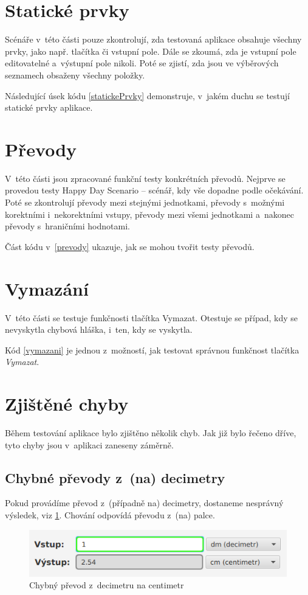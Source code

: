 	\section{Statické prvky}
	Scénáře v~této části pouze zkontrolují, zda testovaná aplikace obsahuje všechny prvky, jako např. tlačítka či vstupní pole. Dále se zkoumá, zda je vstupní pole editovatelné a~výstupní pole nikoli. Poté se zjistí, zda jsou ve výběrových seznamech obsaženy všechny položky.
	
	Následující úsek kódu \ref{statickePrvky} demonstruje, v~jakém duchu se testují statické prvky aplikace.
	
	
	\section{Převody}
	V~této části jsou zpracované funkční testy konkrétních převodů. Nejprve se provedou testy Happy Day Scenario -- scénář, kdy vše dopadne podle očekávání. Poté se zkontrolují převody mezi stejnými jednotkami, převody s~možnými korektními i~nekorektními vstupy, převody mezi všemi jednotkami a~nakonec převody s~hraničními hodnotami.
	
	Část kódu v~\ref{prevody} ukazuje, jak se mohou tvořit testy převodů.
	
	
	\section{Vymazání}
	V~této části se testuje funkčnosti tlačítka Vymazat. Otestuje se případ, kdy se nevyskytla chybová hláška, i~ten, kdy se vyskytla.
	
	Kód \ref{vymazani} je jednou z~možností, jak testovat správnou funkčnost tlačítka \emph{Vymazat}.
	
	
	\section{Zjištěné chyby}
	Během testování aplikace bylo zjištěno několik chyb. Jak již bylo řečeno dříve, tyto chyby jsou v~aplikaci zaneseny záměrně.
	
		\subsection{Chybné převody z~(na) decimetry}
		Pokud provádíme převod z~(případně na) decimetry, dostaneme nesprávný výsledek, viz \ref{ChybaDm}. Chování odpovídá převodu z~(na) palce.
			\begin{figure}[ht!]
				\centering
				\caption{Chybný převod z~decimetru na centimetr}
				\label{ChybaDm}
				\includegraphics[width=13.5cm]{img/Chyby/Dm.png}
			\end{figure}
			\FloatBarrier
		
